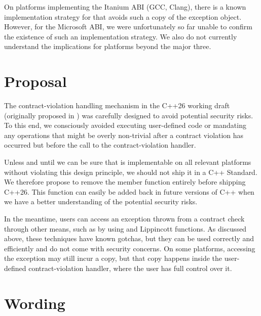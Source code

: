 On platforms implementing the Itanium ABI (GCC, Clang), there is a known implementation strategy for    that avoids such a copy of the exception object. However, for the Microsoft ABI, we were unfortunately so far unable to confirm the existence of such an implementation strategy. We also do not currently understand the implications for platforms beyond the major three.

\section{Proposal}

The contract-violation handling mechanism in the C++26 working draft (originally proposed in \cite{P2811R7}) was carefully designed to avoid potential security risks. To this end, we consciously avoided executing user-defined code or mandating any operations that might be overly non-trivial after a contract violation has occurred but before the call to the contract-violation handler.

Unless and until we can be sure that  is implementable on all relevant platforms without violating this design principle, we should not ship it in a C++ Standard. We therefore propose to remove the member function  entirely before shipping C++26. This function can easily be added back in future versions of C++ when we have a better understanding of the potential security risks.

In the meantime, users can access an exception thrown from a contract check through other means, such as by using  and Lippincott functions. As discussed above, these techniques have known gotchas, but they can be used correctly and efficiently and do not come with security concerns. On some platforms, accessing the exception may still incur a copy, but that copy happens inside the user-defined contract-violation handler, where the user has full control over it.

\section{Wording}


